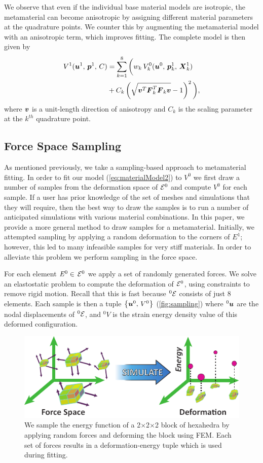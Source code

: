We observe that even if the individual base material models are isotropic, the metamaterial can become anisotropic by assigning different material parameters at the quadrature points. We counter this by augmenting the metamaterial model with an anisotropic term, which improves fitting.
The complete model is then given by
\begin{align}
\begin{split}
V^1(\mbox{$\bm{u}$}^1, \, \mbox{$\bm{p}$}^1, \, C) &= \sum_{k=1}^8 \bigg( w_k \, V_k^0(\mbox{$\bm{u}$}^0, \,\mbox{$\bm{p}$}_k^1, \, \mbox{$\bm{X}$}_k^1)\\
& + C_k\left( \sqrt{\mbox{$\bm{v}$}^T\mbox{$\bm{F}$}_k^T\mbox{$\bm{F}$}_k\mbox{$\bm{v}$}} - 1\right)^2\bigg),\\
\label{eq:materialModel2}
\end{split}
\end{align}
where $\mbox{$\bm{v}$}$ is a unit-length direction of anisotropy and $C_k$ is the scaling parameter at the $k^{th}$ quadrature point. 

\subsection{Force Space Sampling}
\label{sec:force_space_sampling}
As mentioned previously, we take a sampling-based approach to metamaterial fitting. In order to fit our model (\autoref{eq:materialModel2}) to $V^0$ we first draw a number of samples from the deformation space of $\mathcal{E}^0$ and compute $V^0$ for each sample.
If a user has prior knowledge of the set of meshes and simulations that they will require, then the best way to draw the samples is to run a number of anticipated simulations with various material combinations.
In this paper, we provide a more general method to draw samples for a metamaterial.
Initially, we attempted sampling by applying a random deformation to the corners of $\mathit{E}^1$; however, this led to many infeasible samples for very stiff materials.
In order to alleviate this problem we perform sampling in the force space.

For each element $\mathit{E}^0\in \, \mathcal{E}^0$ we apply a set of randomly generated forces.
We solve an elastostatic problem to compute the deformation of $\mathcal{E}^0$, using constraints to remove rigid motion. Recall that this is fast because $^0\mathcal{E}$ consists of just 8 elements.
Each sample is then a tuple $\left\{\mbox{$\bm{u}$}^0, \, V^0\right\}$ (\autoref{fig:sampling}) where $^0\mbox{$\bm{u}$}$ are the nodal displacements of $^0\mathcal{E}$, and $^0V$ is the strain energy density value of this deformed configuration.
\begin{figure}
	\centering
	\includegraphics[width=0.6\columnwidth]{images/sampling.pdf}
	\caption{ We sample the energy function of a 2$\times$2$\times$2 block of hexahedra by applying random forces and deforming the block using FEM. Each set of forces results in a deformation-energy tuple which is used during fitting.}
	\label{fig:sampling}
\end{figure}


